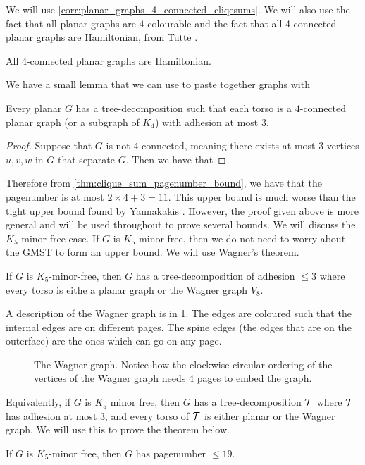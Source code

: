 We will use \cref{corr:planar_graphs_4_connected_cliqesums}. We will also use the fact that all planar graphs are \(4\)-colourable \cite{appelEveryPlanarMap1989} and the fact that all 4-connected planar graphs are Hamiltonian, from Tutte \cite{tutteTheoremPlanarGraphs1956}.

\begin{theorem}\label{thm:4-connected_planar_ham_cycle}
	All 4-connected planar graphs are Hamiltonian.
\end{theorem}

We have a small lemma that we can use to paste together graphs with 

\begin{lemma}\label{corr:planar_graphs_4_connected_cliqesums}
	Every planar \(G\) has a tree-decomposition such that each torso is a \(4\)-connected planar graph (or a subgraph of $K_4$) with adhesion at most \(3\).
\end{lemma}

\begin{proof}
	Suppose that $G$ is not $4$-connected, meaning there exists at most $3$ vertices $u, v, w$ in $G$ that separate $G$. Then we have that 
\end{proof}
Therefore from \cref{thm:clique_sum_pagenumber_bound}, we have that the pagenumber is at most \(2 \times 4 + 3 = 11\).
This upper bound is much worse than the tight upper bound found by Yannakakis \cite{yannakakisEmbeddingPlanarGraphs1989}. However, the proof given above is more general and will be used throughout to prove several bounds.
We will discuss the \(K_5\)-minor free case. If \(G\) is \(K_5\)-minor free, then we do not need to worry about the GMST to form an upper bound. We will use Wagner's theorem.
\begin{theorem}\label{thm:WagnersTheorem}
	If \(G\) is \(K_5\)-minor-free, then \(G\) has a tree-decomposition of adhesion $\leq 3$ where every torso is eithe a planar graph or the Wagner graph \(V_8\).
\end{theorem}
A description of the Wagner graph is in \cref{fig:wagner}. The edges are coloured such that the internal edges are on different pages. The spine edges (the edges that are on the outerface) are the ones which can go on any page.
\begin{figure}[h]
	\centering
	\begin{tikzpicture}
		
	\end{tikzpicture}
	\caption{The Wagner graph. Notice how the clockwise circular ordering of the vertices of the Wagner graph needs 4 pages to embed the graph. }\label{fig:wagner}
\end{figure}
Equivalently, if \(G\) is \(K_5\) minor free, then \(G\) has a tree-decomposition \(\tree\) where \(\tree\) has adhesion at most 3, and every torso of \(\tree\) is either planar or the Wagner graph. We will use this to prove the theorem below.
\begin{theorem}
	If \(G\) is \(K_5\)-minor free, then \(G\) has pagenumber \(\leq 19\).
\end{theorem}

